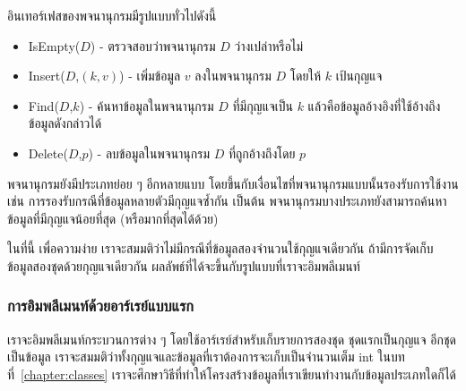 อิน{\wbr}เทอร์เฟส{\wbr}ของ{\wbr}พจนานุกรม{\wbr}มี{\wbr}รูปแบบ{\wbr}ทั่วไป{\wbr}ดังนี้{\wbr}
\begin{itemize}
\item IsEmpty($D$) - ตรวจสอบ{\wbr}ว่า{\wbr}พจนานุกรม $D$ ว่างเปล่า{\wbr}หรือ{\wbr}ไม่{\wbr}
\item Insert($D$,$(k,v)$) - เพิ่ม{\wbr}ข้อมูล $v$ ลง{\wbr}ใน{\wbr}พจนานุกรม $D$ โดย{\wbr}ให้ $k$ เป้{\wbr}น{\wbr}กุญแจ{\wbr}
\item Find($D$,$k$) - ค้นหา{\wbr}ข้อมูล{\wbr}ใน{\wbr}พจนานุกรม $D$ ที่{\wbr}มี{\wbr}กุญแจ{\wbr}เป็น $k$
  แล้ว{\wbr}คือ{\wbr}ข้อมูล{\wbr}อ้างอิง{\wbr}ที่{\wbr}ใช้{\wbr}อ้าง{\wbr}ถึง{\wbr}ข้อมูล{\wbr}ดังกล่าว{\wbr}ได้{\wbr}
\item Delete($D$,$p$) - ลบ{\wbr}ข้อมูล{\wbr}ใน{\wbr}พจนานุกรม $D$ ที่{\wbr}ถูก{\wbr}อ้าง{\wbr}ถึง{\wbr}โดย $p$
\end{itemize}

พจนานุกรม{\wbr}ยัง{\wbr}มี{\wbr}ประเภท{\wbr}ย่อย ๆ อีก{\wbr}หลาย{\wbr}แบบ{\wbr}
โดย{\wbr}ขึ้น{\wbr}กับ{\wbr}เงื่อนไข{\wbr}ที่{\wbr}พจนานุกรม{\wbr}แบบ{\wbr}นั้น{\wbr}รองรับ{\wbr}การ{\wbr}ใช้{\wbr}งาน เช่น{\wbr}
การ{\wbr}รองรับ{\wbr}กรณี{\wbr}ที่{\wbr}ข้อมูล{\wbr}หลาย{\wbr}ตัว{\wbr}มี{\wbr}กุญแจ{\wbr}ซ้ำ{\wbr}กัน เป็นต้น{\wbr}
พจนานุกรม{\wbr}บาง{\wbr}ประเภท{\wbr}ยัง{\wbr}สามารถ{\wbr}ค้นหา{\wbr}ข้อมูล{\wbr}ที่{\wbr}มี{\wbr}กุญแจ{\wbr}น้อย{\wbr}ที่สุด (หรือ{\wbr}มาก{\wbr}ที่สุด{\wbr}ได้{\wbr}ด้วย)

ใน{\wbr}ที่นี้ เพื่อ{\wbr}ความ{\wbr}ง่าย เรา{\wbr}จะ{\wbr}สมมติ{\wbr}ว่า{\wbr}ไม่{\wbr}มี{\wbr}กรณี{\wbr}ที่{\wbr}ข้อมูล{\wbr}สอง{\wbr}จำนวน{\wbr}ใช้{\wbr}กุญแจ{\wbr}เดียวกัน{\wbr}
ถ้า{\wbr}มี{\wbr}การ{\wbr}จัด{\wbr}เก็บ{\wbr}ข้อมูล{\wbr}สอง{\wbr}ชุด{\wbr}ด้วย{\wbr}กุญแจ{\wbr}เดียวกัน ผลลัพธ์{\wbr}ที่{\wbr}ได้{\wbr}จะ{\wbr}ขึ้น{\wbr}กับ{\wbr}รูปแบบ{\wbr}ที่{\wbr}เรา{\wbr}จะ{\wbr}อิม{\wbr}พลี{\wbr}เมนท์

\subsubsection{การ{\wbr}อิม{\wbr}พลี{\wbr}เมนท์{\wbr}ด้วย{\wbr}อาร์เรย์{\wbr}แบบ{\wbr}แรก}

เรา{\wbr}จะ{\wbr}อิม{\wbr}พลี{\wbr}เมนท์{\wbr}กระบวนการ{\wbr}ต่าง ๆ โดย{\wbr}ใช้{\wbr}อาร์เรย์{\wbr}สำหรับ{\wbr}เก็บ{\wbr}รายการ{\wbr}สอง{\wbr}ชุด{\wbr}
ชุด{\wbr}แรก{\wbr}เป็น{\wbr}กุญแจ อีก{\wbr}ชุด{\wbr}เป็น{\wbr}ข้อมูล{\wbr}
เรา{\wbr}จะ{\wbr}สมมติ{\wbr}ว่า{\wbr}ทั้ง{\wbr}กุญแจ{\wbr}และ{\wbr}ข้อมูล{\wbr}ที่{\wbr}เรา{\wbr}ต้องการ{\wbr}จะ{\wbr}เก็บ{\wbr}เป็น{\wbr}จำนวนเต็ม {\ct int}
ใน{\wbr}บท{\wbr}ที่~\ref{chapter:classes}
เรา{\wbr}จะ{\wbr}ศึกษา{\wbr}วิธี{\wbr}ที่{\wbr}ทำ{\wbr}ให้{\wbr}โครงสร้าง{\wbr}ข้อมูล{\wbr}ที่{\wbr}เรา{\wbr}เขียน{\wbr}ทำงาน{\wbr}กับ{\wbr}ข้อมูล{\wbr}ประเภท{\wbr}ใด{\wbr}ก็ได้{\wbr}

